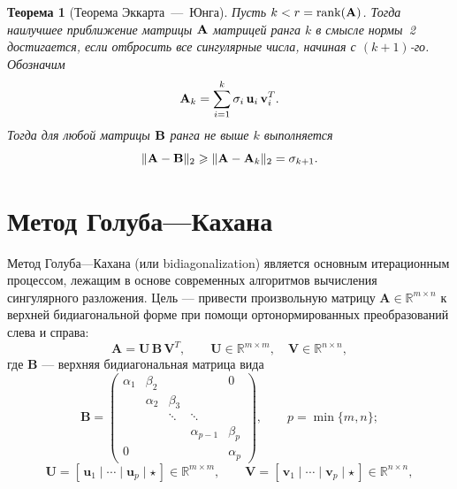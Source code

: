 \documentclass[12pt]{article}
\newtheorem{theorem}{Теорема}
\begin{document}
	
	\begin{theorem}[Теорема Эккарта~---~Юнга]
		Пусть $k < r = \operatorname{rank}(\textbf{\textup{A}})$. 
		Тогда наилучшее приближение матрицы $\textbf{\textup{A}}$ матрицей ранга $k$ 
		в смысле нормы~2 достигается, если отбросить все сингулярные числа, начиная с $(k+1)$-го.  
		Обозначим
		\begin{equation}
			\textbf{\textup{A}}_{k} = 
			\sum_{i = 1}^{k} 
			\sigma_i\, \textbf{\textup{u}}_i\, \textbf{\textup{v}}_i^{T}.
			\label{eq:eckart-young-ak}
		\end{equation}
		Тогда для любой матрицы $\textbf{\textup{B}}$ ранга не выше $k$ выполняется
		\begin{equation}
			\|\textbf{\textup{A}} - \textbf{\textup{B}}\|_{2} 
			\geqslant 
			\|\textbf{\textup{A}} - \textbf{\textup{A}}_{k}\|_{2} 
			= \sigma_{k+1}.
			\label{eq:eckart-young-error}
		\end{equation}
	\end{theorem}
	
	
	
	
	
	\section*{Метод Голуба---Кахана}
	
	Метод Голуба---Кахана (или bidiagonalization) является основным
	итерационным процессом, лежащим в основе современных алгоритмов вычисления
	сингулярного разложения. Цель --- привести произвольную матрицу
	$\mathbf{A} \in \mathbb{R}^{m \times n}$ к верхней бидиагональной форме при помощи
	ортонормированных преобразований слева и справа:
	$$
	\mathbf{A} = \mathbf{U}\, \mathbf{B}\, \mathbf{V}^{T},
	\qquad
	\mathbf{U} \in \mathbb{R}^{m \times m},\quad
	\mathbf{V} \in \mathbb{R}^{n \times n},
	$$
	где $\mathbf{B}$ --- верхняя бидиагональная матрица вида
	$$
	\mathbf{B} = 
	\begin{pmatrix}
		\alpha_{1} & \beta_{2}  &        &        & 0 \\
		& \alpha_{2} & \beta_{3} &        &   \\
		&            & \ddots & \ddots &   \\
		&            &        & \alpha_{p-1} & \beta_{p} \\
		0          &            &        &             & \alpha_{p}
	\end{pmatrix},
	\qquad
	p = \min\{m,n\};
	$$
	$$
	\mathbf{U} = [\,\mathbf{u}_1 \mid \cdots \mid \mathbf{u}_p \mid \star \,] \in \mathbb{R}^{m\times m}, 
	\qquad
	\mathbf{V} = [\,\mathbf{v}_1 \mid \cdots \mid \mathbf{v}_p \mid \star \,] \in \mathbb{R}^{n\times n},
	$$
	
\end{document}
